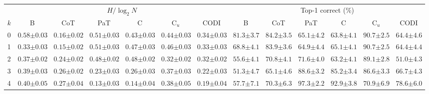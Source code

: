 \begin{table}[!t]
\centering
\tiny
\setlength{\tabcolsep}{3pt}
\begin{tabular}{l cccccc cccccc}
\toprule
 & \multicolumn{6}{c}{$H/\log_2 N$} & \multicolumn{6}{c}{Top-1 correct (\%)} \\
\cmidrule(lr){2-7} \cmidrule(lr){8-13}
$k$ & B & CoT & PaT & C & C$_u$ & CODI & B & CoT & PaT & C & C$_u$ & CODI \\
\midrule
0 & $0.58 {\scriptstyle \pm 0.03}$ & $0.16 {\scriptstyle \pm 0.02}$ & $0.51 {\scriptstyle \pm 0.03}$ & $0.43 {\scriptstyle \pm 0.03}$ & $0.44 {\scriptstyle \pm 0.03}$ & $0.34 {\scriptstyle \pm 0.03}$ & $81.3 {\scriptstyle \pm 3.7}$ & $84.2 {\scriptstyle \pm 3.5}$ & $65.1 {\scriptstyle \pm 4.2}$ & $63.8 {\scriptstyle \pm 4.1}$ & $90.7 {\scriptstyle \pm 2.5}$ & $64.4 {\scriptstyle \pm 4.6}$ \\
1 & $0.33 {\scriptstyle \pm 0.03}$ & $0.15 {\scriptstyle \pm 0.02}$ & $0.51 {\scriptstyle \pm 0.03}$ & $0.47 {\scriptstyle \pm 0.03}$ & $0.46 {\scriptstyle \pm 0.03}$ & $0.33 {\scriptstyle \pm 0.03}$ & $68.8 {\scriptstyle \pm 4.1}$ & $83.9 {\scriptstyle \pm 3.6}$ & $64.9 {\scriptstyle \pm 4.4}$ & $65.1 {\scriptstyle \pm 4.1}$ & $90.7 {\scriptstyle \pm 2.5}$ & $64.4 {\scriptstyle \pm 4.4}$ \\
2 & $0.37 {\scriptstyle \pm 0.02}$ & $0.24 {\scriptstyle \pm 0.02}$ & $0.48 {\scriptstyle \pm 0.02}$ & $0.48 {\scriptstyle \pm 0.02}$ & $0.32 {\scriptstyle \pm 0.02}$ & $0.32 {\scriptstyle \pm 0.02}$ & $55.6 {\scriptstyle \pm 4.1}$ & $70.8 {\scriptstyle \pm 4.1}$ & $71.6 {\scriptstyle \pm 4.0}$ & $63.2 {\scriptstyle \pm 4.1}$ & $89.1 {\scriptstyle \pm 2.8}$ & $51.0 {\scriptstyle \pm 4.3}$ \\
3 & $0.39 {\scriptstyle \pm 0.03}$ & $0.26 {\scriptstyle \pm 0.02}$ & $0.23 {\scriptstyle \pm 0.03}$ & $0.26 {\scriptstyle \pm 0.03}$ & $0.37 {\scriptstyle \pm 0.03}$ & $0.22 {\scriptstyle \pm 0.03}$ & $51.3 {\scriptstyle \pm 4.7}$ & $65.1 {\scriptstyle \pm 4.6}$ & $88.6 {\scriptstyle \pm 3.2}$ & $85.2 {\scriptstyle \pm 3.4}$ & $86.6 {\scriptstyle \pm 3.3}$ & $66.7 {\scriptstyle \pm 4.3}$ \\
4 & $0.40 {\scriptstyle \pm 0.05}$ & $0.27 {\scriptstyle \pm 0.04}$ & $0.13 {\scriptstyle \pm 0.03}$ & $0.14 {\scriptstyle \pm 0.04}$ & $0.38 {\scriptstyle \pm 0.05}$ & $0.19 {\scriptstyle \pm 0.04}$ & $57.7 {\scriptstyle \pm 7.1}$ & $70.3 {\scriptstyle \pm 6.3}$ & $97.3 {\scriptstyle \pm 2.2}$ & $92.9 {\scriptstyle \pm 3.8}$ & $70.9 {\scriptstyle \pm 6.9}$ & $78.6 {\scriptstyle \pm 6.0}$ \\

\end{tabular}
\end{table}
